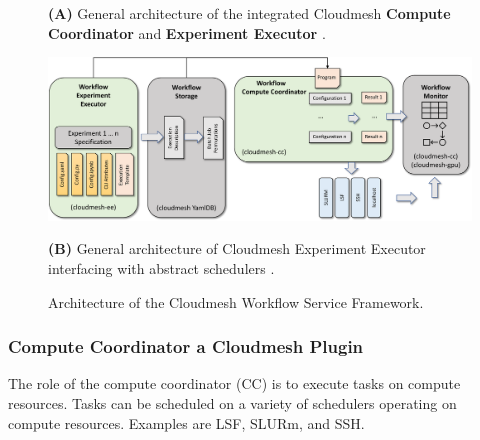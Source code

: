\documentclass[utf8]{FrontiersinVancouver} %
\begin{document}
\begin{figure}[htb]
{    {\bf (A)} General architecture of the integrated Cloudmesh {\bf Compute Coordinator} and {\bf Experiment Executor} \citep{las-frontiers-edu}.

\bigskip\bigskip
    
    \centering\includegraphics[width=1.0\columnwidth]{images/cloudmesh-ee-new}
    
    
    {\bf (B)} General architecture of Cloudmesh Experiment Executor interfacing with abstract schedulers \citep{las-frontiers-edu}.
  }

  
  
    \caption{Architecture of the Cloudmesh Workflow Service Framework.}
    \label{fig:cc-2}

\end{figure}


 
\subsubsection{Compute Coordinator a Cloudmesh Plugin}
\label{sec:workflow-cc}

The role of the compute coordinator (CC) is to execute tasks on compute resources. Tasks can be scheduled on a variety of schedulers operating on compute resources. Examples are LSF, SLURm, and SSH.
\end{document}
